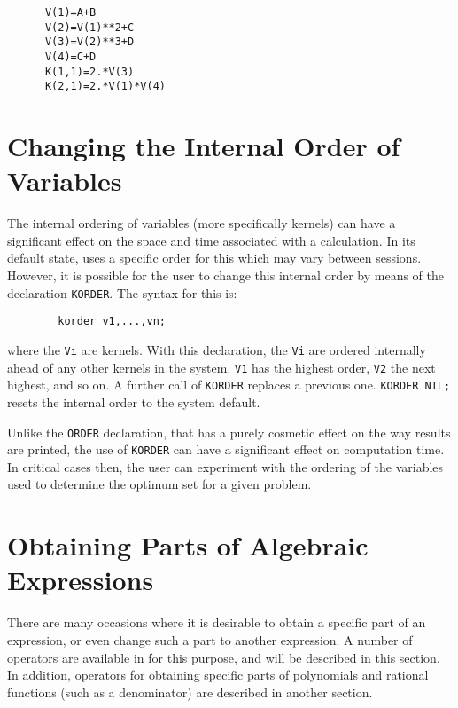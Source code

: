\begin{verbatim}
      V(1)=A+B
      V(2)=V(1)**2+C
      V(3)=V(2)**3+D
      V(4)=C+D
      K(1,1)=2.*V(3)
      K(2,1)=2.*V(1)*V(4)
\end{verbatim}

\section{Changing the Internal Order of Variables}
\hypertarget{command:KORDER}{}

The internal ordering of variables (more specifically kernels) can have
a significant effect on the space and time associated with a calculation.
In its default state, {\REDUCE} uses a specific order for this which may
vary between sessions.  However, it is possible for the user to change
this internal order by means of the declaration
\texttt{KORDER}.
The syntax for this is:
\begin{verbatim}
        korder v1,...,vn;
\end{verbatim}
where the \texttt{Vi} are kernels.  With this declaration, the
\texttt{Vi} are ordered internally ahead of any other kernels in the system.
\texttt{V1} has the highest order, \texttt{V2} the next highest, and so on.  A
further call of \texttt{KORDER} replaces a previous one. \texttt{KORDER NIL;}
resets the internal order to the system default.

Unlike the \texttt{ORDER} declaration, that has a purely
cosmetic effect on the way results are printed, the use of \texttt{KORDER}
can have a significant effect on computation time.  In critical cases
then, the user can experiment with the ordering of the variables used to
determine the optimum set for a given problem.

\section{Obtaining Parts of Algebraic Expressions}

There are many occasions where it is desirable to obtain a specific part
of an expression, or even change such a part to another expression. A
number of operators are available in {\REDUCE} for this purpose, and will be
described in this section. In addition, operators for obtaining specific
parts of polynomials and rational functions (such as a denominator) are
described in another section.

